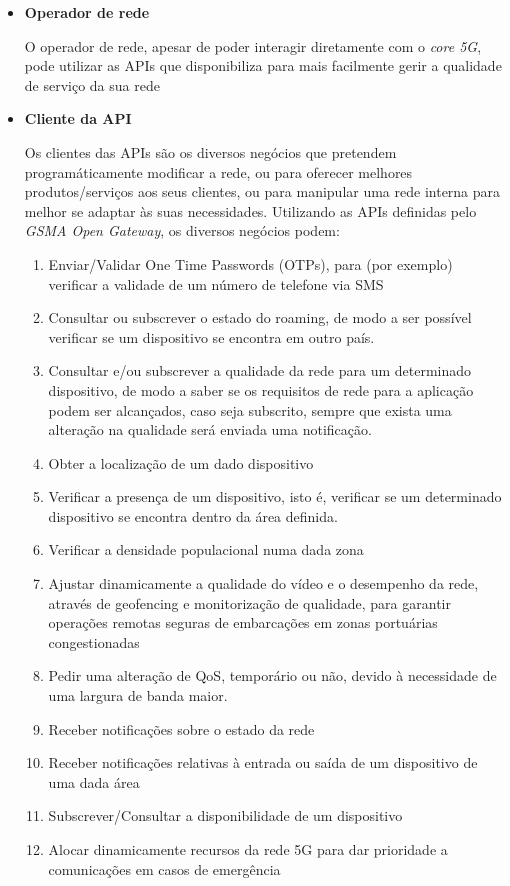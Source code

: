 \begin{itemize} \item \textbf{Operador de rede}

	      O operador de rede, apesar de poder interagir diretamente com o \emph{core
		      5G}, pode utilizar as APIs que disponibiliza para mais facilmente gerir a
	      qualidade de serviço da sua rede

	\item{\textbf{Cliente da API}}

	      Os clientes das APIs são os diversos negócios que pretendem
	      programáticamente modificar a rede, ou para oferecer melhores
	      produtos/serviços aos seus clientes, ou para manipular uma rede interna
	      para melhor se adaptar às suas necessidades. Utilizando as APIs definidas
	      pelo \emph{GSMA Open Gateway}, os diversos negócios podem:
	      \begin{enumerate}
		      \item Enviar/Validar One Time Passwords (OTPs), para (por exemplo)
		            verificar a validade de um número de telefone via SMS
		      \item Consultar ou subscrever o estado do roaming, de modo a ser
		            possível verificar se um dispositivo se encontra em outro país.
		      \item Consultar e/ou subscrever a qualidade da rede para um
		            determinado dispositivo, de modo a saber se os requisitos de rede
		            para a aplicação podem ser alcançados, caso seja subscrito, sempre
		            que exista uma alteração na qualidade será enviada uma notificação.
		      \item Obter a localização de um dado dispositivo
		      \item Verificar a presença de um dispositivo, isto é, verificar se um
		            determinado dispositivo se encontra dentro da área definida.
		      \item Verificar a densidade populacional numa dada zona
		      \item Ajustar dinamicamente a qualidade do vídeo e o desempenho da
		            rede, através de geofencing e monitorização de qualidade, para
		            garantir operações remotas seguras de embarcações em zonas
		            portuárias congestionadas \cite{10620807}
		      \item Pedir uma alteração de QoS, temporário ou não, devido à
		            necessidade de uma largura de banda maior.
		      \item Receber notificações sobre o estado da rede
		      \item Receber notificações relativas à entrada ou saída de um
		            dispositivo de uma dada área
		      \item Subscrever/Consultar a disponibilidade de um dispositivo
		      \item Alocar dinamicamente recursos da rede 5G para dar prioridade a
		            comunicações em casos de emergência \cite{ccam5g}
	      \end{enumerate} \end{itemize}
